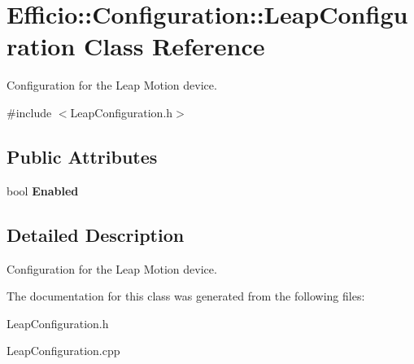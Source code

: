 \hypertarget{class_efficio_1_1_configuration_1_1_leap_configuration}{}\section{Efficio\+:\+:Configuration\+:\+:Leap\+Configuration Class Reference}
\label{class_efficio_1_1_configuration_1_1_leap_configuration}


Configuration for the Leap Motion device.  




{\ttfamily \#include $<$Leap\+Configuration.\+h$>$}

\subsection*{Public Attributes}
\begin{DoxyCompactItemize}
\item 
bool {\bfseries Enabled}\hypertarget{class_efficio_1_1_configuration_1_1_leap_configuration_a237eb567a1666e71d13e93bb2e9d86a9}{}\label{class_efficio_1_1_configuration_1_1_leap_configuration_a237eb567a1666e71d13e93bb2e9d86a9}

\end{DoxyCompactItemize}


\subsection{Detailed Description}
Configuration for the Leap Motion device. 

The documentation for this class was generated from the following files\+:\begin{DoxyCompactItemize}
\item 
Leap\+Configuration.\+h\item 
Leap\+Configuration.\+cpp\end{DoxyCompactItemize}
